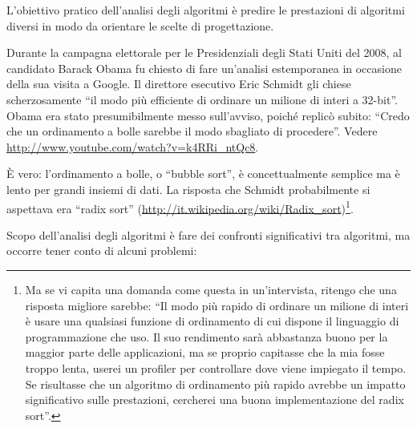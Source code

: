 \documentclass[10pt]{book}
\begin{document}
L'obiettivo pratico dell'analisi degli algoritmi è predire le prestazioni di algoritmi diversi in modo da orientare le scelte di progettazione.

Durante la campagna elettorale per le Presidenziali degli Stati Uniti del 2008, al candidato Barack Obama fu chiesto di fare un'analisi estemporanea in occasione della sua visita a Google. Il direttore esecutivo Eric Schmidt gli chiese scherzosamente ``il modo più efficiente di ordinare un milione di interi a 32-bit''.
Obama era stato presumibilmente messo sull'avviso, poiché replicò subito: ``Credo che un ordinamento a bolle sarebbe il modo sbagliato di procedere''.
Vedere \url{http://www.youtube.com/watch?v=k4RRi_ntQc8}.

È vero: l'ordinamento a bolle, o ``bubble sort'', è concettualmente semplice ma è lento per grandi insiemi di dati. La risposta che Schmidt probabilmente si aspettava era ``radix sort'' (\url{http://it.wikipedia.org/wiki/Radix_sort})\footnote{Ma se vi capita una domanda come questa in un'intervista, ritengo che una risposta migliore sarebbe: ``Il modo più rapido di ordinare un milione di interi è usare una qualsiasi funzione di ordinamento di cui dispone il linguaggio di programmazione che uso. Il suo rendimento sarà abbastanza buono per la maggior parte delle applicazioni, ma se proprio capitasse che la mia fosse troppo lenta, userei un profiler per controllare dove viene impiegato il tempo. Se risultasse che un algoritmo di ordinamento più rapido avrebbe un impatto significativo sulle prestazioni, cercherei una buona implementazione del radix sort''.}.

Scopo dell'analisi degli algoritmi è fare dei confronti significativi tra algoritmi, ma occorre tener conto di alcuni problemi:
\end{document}
